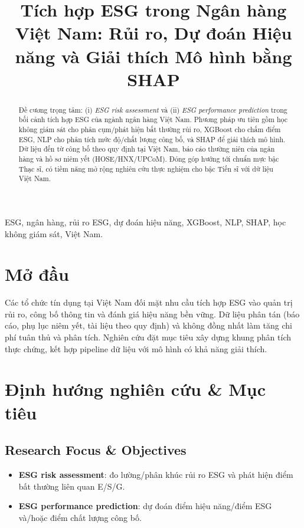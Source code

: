 \documentclass[conference]{IEEEtran}
\title{{Tích hợp ESG trong Ngân hàng Việt Nam: Rủi ro, Dự đoán Hiệu năng và Giải thích Mô hình bằng SHAP}}
\author{
\IEEEauthorblockN{{Phạm Quang Thịnh (Leo)}}
\IEEEauthorblockA{{Khoa học Máy tính, Trường đại học Công Nghệ Nghệ- Đại học Quốc gia Hà Nội}\\
Email: 23035092@vnu.edu.vn}
}
\begin{document}
\maketitle

\begin{abstract}
Đề cương trọng tâm: (i) \textit{ESG risk assessment} và (ii) \textit{ESG performance prediction} trong bối cảnh tích hợp ESG của ngành ngân hàng Việt Nam. Phương pháp ưu tiên gồm học không giám sát cho phân cụm/phát hiện bất thường rủi ro, XGBoost cho chấm điểm ESG, NLP cho phân tích mức độ/chất lượng công bố, và SHAP để giải thích mô hình. Dữ liệu đến từ công bố theo quy định tại Việt Nam, báo cáo thường niên của ngân hàng và hồ sơ niêm yết (HOSE/HNX/UPCoM). Đóng góp hướng tới chuẩn mực bậc Thạc sĩ, có tiềm năng mở rộng nghiên cứu thực nghiệm cho bậc Tiến sĩ với dữ liệu Việt Nam.
\end{abstract}

\begin{IEEEkeywords}
ESG, ngân hàng, rủi ro ESG, dự đoán hiệu năng, XGBoost, NLP, SHAP, học không giám sát, Việt Nam.
\end{IEEEkeywords}

\section{Mở đầu}
Các tổ chức tín dụng tại Việt Nam đối mặt nhu cầu tích hợp ESG vào quản trị rủi ro, công bố thông tin và đánh giá hiệu năng bền vững. Dữ liệu phân tán (báo cáo, phụ lục niêm yết, tài liệu theo quy định) và không đồng nhất làm tăng chi phí tuân thủ và phân tích. Nghiên cứu đặt mục tiêu xây dựng khung phân tích thực chứng, kết hợp pipeline dữ liệu với mô hình có khả năng giải thích.

\section{Định hướng nghiên cứu \& Mục tiêu}
\subsection{Research Focus \& Objectives}
\begin{itemize}
    \item \textbf{ESG risk assessment}: đo lường/phân khúc rủi ro ESG và phát hiện điểm bất thường liên quan E/S/G.
    \item \textbf{ESG performance prediction}: dự đoán điểm hiệu năng/điểm ESG và/hoặc điểm chất lượng công bố.
\end{itemize}
\end{document}
